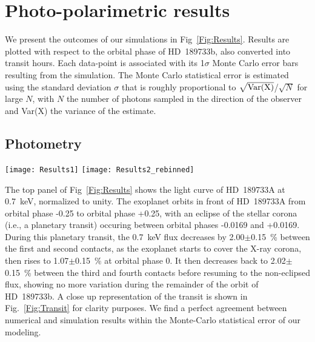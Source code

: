 \documentclass[iop]{emulateapj}
\begin{document}
\section{Photo-polarimetric results}
\label{Results}
 
We present the outcomes of our simulations in Fig~\ref{Fig:Results}. Results are plotted with respect to the orbital phase of HD~189733b,
also converted into transit hours. Each data-point is associated with its 1$\sigma$ Monte Carlo error bars resulting from the simulation. 
The Monte Carlo statistical error is estimated using the standard deviation $\sigma$ that is roughly proportional to $\sqrt{\rm Var(X)}$/$\sqrt{N}$ 
for large $N$, with $N$ the number of photons sampled in the direction of the observer and Var(X) the variance of the estimate. 


\subsection{Photometry}
\label{Results:photometry}

\begin{figure*}
  \centering
  \texttt{[image: Results1]} 
  \texttt{[image: Results2\_rebinned]} 
  \caption{Photometry at $E_\mathrm{mean}$=0.7~keV of HD~189733A, and reprocessed flux from the surface of HD~189733b (first 
	   two panels). The fluxes are normalized to the initial flux of the star. Polarimetric results
	   are shown in terms of $P$ (polarization percentage) and $\psi$ (polarization position angle, 
	   defined with respect to the vertical axis of the system). The error bars correspond to 
	   1$\sigma$ statistical errors in the Monte Carlo simulation. The vertical dashed lines are 
	   the first, second, third and fourth contacts of the primary (planetary transit) and 
	   secondary eclipses in the optical. The gray box indicates a region where polarization 
	   measurement of HD~189733b is impossible due to the disappearance of the exoplanet behind 
	   its star.}
  \label{Fig:Results} 
\end{figure*}

The top panel of Fig~\ref{Fig:Results} shows the light curve of HD~189733A at 0.7~keV, normalized to unity. The exoplanet 
orbits in front of HD~189733A from orbital phase -0.25 to orbital phase +0.25, with an eclipse of the stellar corona 
(i.e., a planetary transit) occuring between orbital phases -0.0169 and +0.0169. During this planetary transit, the 
0.7~keV flux decreases by 2.00$\pm$0.15~\% between the first and second contacts, as the exoplanet starts to cover the X-ray 
corona, then rises to 1.07$\pm$0.15~\% at orbital phase 0. It then decreases back to 2.02$\pm$0.15~\% between the third and 
fourth contacts before resuming to the non-eclipsed flux, showing no more variation during the remainder of the orbit of HD~189733b. 
A close up representation of the transit is shown in Fig.~\ref{Fig:Transit} for clarity purposes. We find a perfect agreement 
between numerical and simulation results within the Monte-Carlo statistical error of our modeling.
\end{document}
